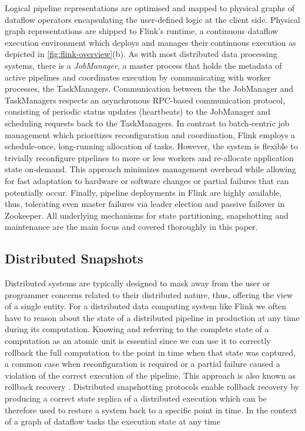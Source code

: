 Logical pipeline representations are optimised and mapped to physical graphs of dataflow operators encapsulating the user-defined logic at the client side. Physical graph representations are shipped to Flink's runtime, a continuous dataflow execution environment which deploys and manages their continuous execution as depicted in \autoref{fig:flink-overview}(b). As with most distributed data processing systems, there is a \emph{JobManager}, a master process that holds the metadata of active pipelines and coordinates execution by communicating with worker processes, the TaskManagers. Communication between the the JobManager and TaskManagers respects an asynchronous RPC-based communication protocol, consisting of periodic status updates (heartbeats) to the JobManager and scheduling requests back to the TaskManagers. In contrast to batch-centric job management \cite{zaharia2012discretized,venkataramandrizzle} which prioritizes reconfiguration and coordination, Flink employs a schedule-once, long-running allocation of tasks. However, the system is flexible to trivially reconfigure pipelines to more or less workers and re-allocate application state on-demand. This approach minimizes management overhead while allowing for fast adaptation to hardware or software changes or partial failures that can potentially occur. Finally, pipeline deployments in Flink are highly available, thus, tolerating even master failures via leader election and passive failover in Zookeeper. All underlying mechanisms for state partitioning, snapshotting and maintenance are the main focus and covered thoroughly in this paper.


\subsection{Distributed Snapshots}

Distributed systems are typically designed to mask away from the user or programmer concerns related to their distributed nature, thus, offering the view of a single entity. For a distributed data computing system like Flink we often have to reason about the state of a distributed pipeline in production at any time during its computation. Knowing and referring to the complete state of a computation as an atomic unit is essential since we can use it to correctly rollback the full computation to the point in time when that state was captured, a common case when reconfiguration is required or a partial failure caused a violation of the correct execution of the pipeline. This approach is also known as rollback recovery \cite{elnozahy2002survey}. Distributed snapshotting \cite{chandy1985distributed} protocols enable rollback recovery by producing a correct state replica of a distributed execution which can be therefore used to restore a system back to a specific point in time. In the context of a graph of dataflow tasks the execution state at any time 

